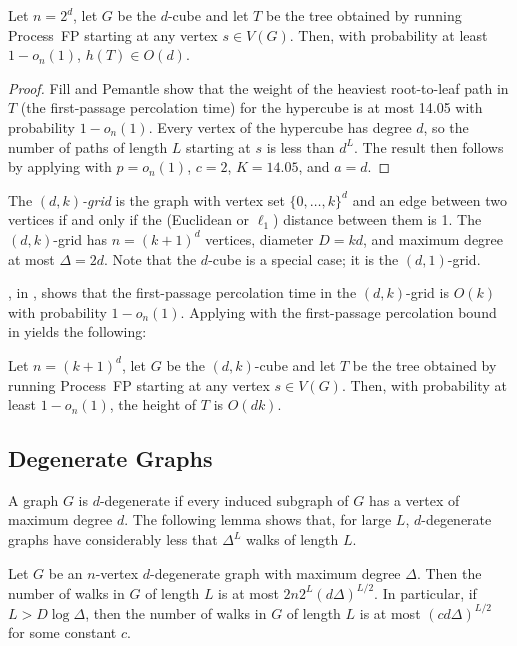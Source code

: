 \documentclass[lotsofwhite]{patmorin}
\begin{document}
\begin{thm}
  Let $n=2^d$, let $G$ be the $d$-cube and let $T$ be the tree obtained
  by running Process~FP starting at any vertex $s\in V(G)$.  Then,
  with probability at least $1-o_n(1)$, $h(T)\in O(d)$.
\end{thm}

\begin{proof}
  Fill and Pemantle \cite{fill.pemantle:percolation} show that the weight of
  the heaviest root-to-leaf path in $T$ (the first-passage percolation
  time) for the hypercube is at most 14.05 with probability $1-o_n(1)$.
  Every vertex of the hypercube has degree $d$, so the number of paths
  of length $L$ starting at $s$ is less than $d^L$.  The result then follows
  by applying  with $p=o_n(1)$, $c=2$, $K=14.05$,
  and $a=d$.
\end{proof}

The \emph{$(d,k)$-grid} is the graph with vertex set $\{0,\ldots,k\}^d$
and an edge between two vertices if and only if the (Euclidean or
$\ell_1$) distance between them is 1.  The $(d,k)$-grid has $n=(k+1)^d$
vertices, diameter $D=kd$, and maximum degree at most $\Delta=2d$. Note
that the $d$-cube is a special case; it is the $(d,1)$-grid.

, in , shows that
the first-passage percolation time in the $(d,k)$-grid is $O(k)$ with
probability $1-o_n(1)$.  Applying  with 
the first-passage percolation bound in  yields
the following:

\begin{cor}
  Let $n=(k+1)^d$, let $G$ be the $(d,k)$-cube and let $T$ be the tree obtained
  by running Process~FP starting at any vertex $s\in V(G)$.  Then,
  with probability at least $1-o_n(1)$, the height of $T$ is $O(dk)$.
\end{cor}

\subsection{Degenerate Graphs}

A graph $G$ is $d$-degenerate if every induced subgraph of $G$ has
a vertex of maximum degree $d$.  The following lemma shows that, for
large $L$, $d$-degenerate graphs have considerably less that $\Delta^L$
walks of length $L$.

\begin{lem}
   Let $G$ be an $n$-vertex $d$-degenerate graph with maximum degree
   $\Delta$.  Then the number of walks in $G$ of length $L$ is at most
   $2n2^{L}(d\Delta)^{L/2}$.  In particular, if $L > D\log\Delta$, then
   the number of walks in $G$ of length $L$ is at most $(cd\Delta)^{L/2}$
   for some constant $c$.
\end{lem}
\end{document}
